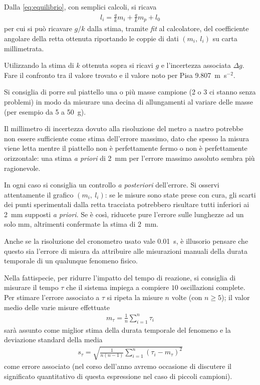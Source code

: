 \documentclass{lab1-article}
\begin{document}
\begin{article}

Dalla \eqref{eq:equilibrio}, con semplici calcoli, si ricava
\begin{align}
l_i = \frac{g}{k}m_i + \frac{g}{k}m_p + l_0
\end{align}
per cui si pu\`o ricavare $g/k$ dalla stima, tramite \emph{fit} al calcolatore,
del coefficiente angolare della retta ottenuta riportando le coppie di dati
$(m_i,~l_i)$ su carta millimetrata.

Utilizzando la stima di $k$ ottenuta sopra si ricavi $g$ e l'incertezza
associata $\Delta g$. Fare il confronto tra il valore trovato e il valore noto
per Pisa 9.807~m~s$^{-2}$.


\secconsiderations


Si consiglia di porre sul piattello una o pi\`u masse campione
(2 o 3 ci stanno senza problemi) in modo da misurare una decina di allungamenti
al variare delle masse (per esempio da 5 a 50~g).



Il millimetro di incertezza dovuto alla risoluzione del metro a nastro potrebbe
non essere sufficiente come stima dell'errore massimo, dato che spesso la
misura viene letta mentre il piattello non \`e perfettamente fermo o non \`e
perfettamente orizzontale: una stima \emph{a priori} di 2~mm per l'errore
massimo assoluto sembra pi\`u ragionevole.

In ogni caso si consiglia un controllo \emph{a posteriori} dell'errore.
Si osservi attentamente il grafico $(m_i,~l_i)$: se le misure sono state prese
con cura, gli scarti dei punti sperimentali dalla retta tracciata potrebbero
risultare tutti inferiori ai 2~mm supposti \emph{a priori}. Se \`e cos\`i,
riducete pure l'errore sulle lunghezze ad un solo mm, altrimenti confermate la
stima di 2~mm.


Anche se la risoluzione del cronometro usato vale 0.01~s, \`e illusorio
pensare che questo sia l'errore di misura da attribuire alle misurazioni
manuali della durata temporale di un qualunque fenomeno fisico.

Nella fattispecie, per ridurre l'impatto del tempo di reazione, si consiglia
di misurare il tempo $\tau$ che il sistema impiega a compiere $10$
oscillazioni complete. Per stimare l'errore associato a $\tau$ si ripeta la
misure $n$ volte (con $n \geq 5$); il valor medio delle varie misure effettuate
\begin{align}
  m_{\tau} = \frac{1}{n}\sum_{i = 1}^n \tau_i
\end{align}
sar\`a assunto come miglior stima della durata temporale del fenomeno e la
deviazione standard della media
\begin{align}
  s_\tau = \sqrt{\frac{1}{n(n-1)}\sum_{i = 1}^n(\tau_i - m_\tau)^2}
\end{align}
come errore associato (nel corso dell'anno avremo occasione di discutere il
significato quantitativo di questa espressione nel caso di piccoli campioni).


\end{article}
\end{document}
